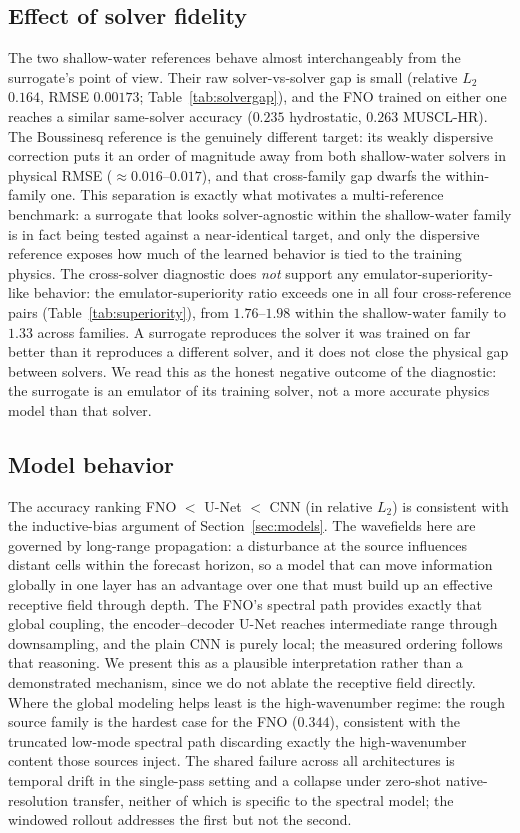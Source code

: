 \subsection{Effect of solver fidelity}
The two shallow-water references behave almost interchangeably from the surrogate's point of view. Their raw solver-vs-solver gap is small (relative $L_2$ $0.164$, RMSE $0.00173$; Table~\ref{tab:solvergap}), and the FNO trained on either one reaches a similar same-solver accuracy ($0.235$ hydrostatic, $0.263$ MUSCL-HR). The Boussinesq reference is the genuinely different target: its weakly dispersive correction puts it an order of magnitude away from both shallow-water solvers in physical RMSE ($\approx 0.016$--$0.017$), and that cross-family gap dwarfs the within-family one. This separation is exactly what motivates a multi-reference benchmark: a surrogate that looks solver-agnostic within the shallow-water family is in fact being tested against a near-identical target, and only the dispersive reference exposes how much of the learned behavior is tied to the training physics. The cross-solver diagnostic does \emph{not} support any emulator-superiority-like behavior: the emulator-superiority ratio exceeds one in all four cross-reference pairs (Table~\ref{tab:superiority}), from $1.76$--$1.98$ within the shallow-water family to $1.33$ across families. A surrogate reproduces the solver it was trained on far better than it reproduces a different solver, and it does not close the physical gap between solvers. We read this as the honest negative outcome of the diagnostic: the surrogate is an emulator of its training solver, not a more accurate physics model than that solver.

\subsection{Model behavior}
The accuracy ranking FNO $<$ U-Net $<$ CNN (in relative $L_2$) is consistent with the inductive-bias argument of Section~\ref{sec:models}. The wavefields here are governed by long-range propagation: a disturbance at the source influences distant cells within the forecast horizon, so a model that can move information globally in one layer has an advantage over one that must build up an effective receptive field through depth. The FNO's spectral path provides exactly that global coupling, the encoder--decoder U-Net reaches intermediate range through downsampling, and the plain CNN is purely local; the measured ordering follows that reasoning. We present this as a plausible interpretation rather than a demonstrated mechanism, since we do not ablate the receptive field directly. Where the global modeling helps least is the high-wavenumber regime: the rough source family is the hardest case for the FNO ($0.344$), consistent with the truncated low-mode spectral path discarding exactly the high-wavenumber content those sources inject. The shared failure across all architectures is temporal drift in the single-pass setting and a collapse under zero-shot native-resolution transfer, neither of which is specific to the spectral model; the windowed rollout addresses the first but not the second.

